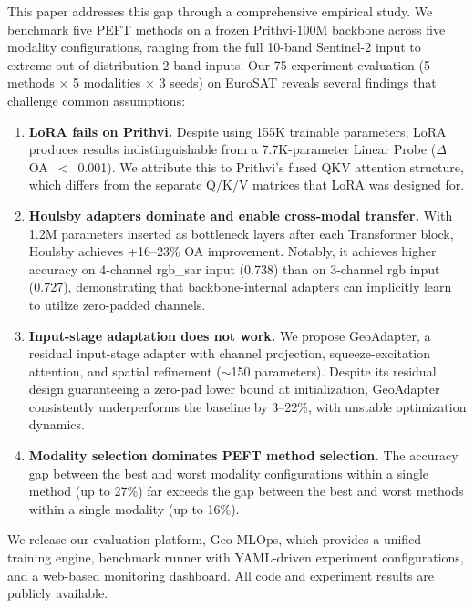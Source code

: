 \documentclass{article}
\begin{document}
This paper addresses this gap through a comprehensive empirical study. We benchmark five PEFT methods on a frozen Prithvi-100M backbone across five modality configurations, ranging from the full 10-band Sentinel-2 input to extreme out-of-distribution 2-band inputs. Our 75-experiment evaluation (5 methods $\times$ 5 modalities $\times$ 3 seeds) on EuroSAT \citep{helber2019eurosat} reveals several findings that challenge common assumptions:

\begin{enumerate}
\item \textbf{LoRA fails on Prithvi.} Despite using 155K trainable parameters, LoRA produces results indistinguishable from a 7.7K-parameter Linear Probe ($\Delta$OA~$<$~0.001). We attribute this to Prithvi's fused QKV attention structure, which differs from the separate Q/K/V matrices that LoRA was designed for.

\item \textbf{Houlsby adapters dominate and enable cross-modal transfer.} With 1.2M parameters inserted as bottleneck layers after each Transformer block, Houlsby achieves +16--23\% OA improvement. Notably, it achieves higher accuracy on 4-channel rgb\_sar input (0.738) than on 3-channel rgb input (0.727), demonstrating that backbone-internal adapters can implicitly learn to utilize zero-padded channels.

\item \textbf{Input-stage adaptation does not work.} We propose GeoAdapter, a residual input-stage adapter with channel projection, squeeze-excitation attention, and spatial refinement ($\sim$150 parameters). Despite its residual design guaranteeing a zero-pad lower bound at initialization, GeoAdapter consistently underperforms the baseline by 3--22\%, with unstable optimization dynamics.

\item \textbf{Modality selection dominates PEFT method selection.} The accuracy gap between the best and worst modality configurations within a single method (up to 27\%) far exceeds the gap between the best and worst methods within a single modality (up to 16\%).
\end{enumerate}

We release our evaluation platform, Geo-MLOps, which provides a unified training engine, benchmark runner with YAML-driven experiment configurations, and a web-based monitoring dashboard. All code and experiment results are publicly available.

\end{document}
